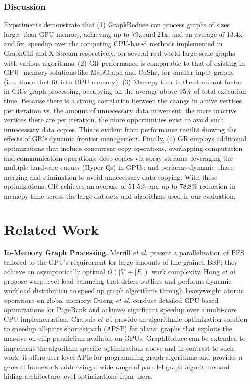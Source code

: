 \subsubsection{Discussion}
Experiments demonstrate that (1) GraphReduce can process graphs of sizes larger than GPU memory, achieving up to 79x and 21x, and an average of 13.4x and 5x, speedup over the competing CPU-based methods implemented in GraphChi and X-Stream respectively, for several real-world 
large-scale graphs with various algorithms. (2) GR performance is comparable to that of existing in-GPU- memory solutions like 
MapGraph and CuSha, for smaller input graphs (i.e., those that fit into GPU memory). (3) Memcpy time is the dominant factor in GR's
graph processing, occupying on the average above 95\% of total execution time. Because there is a strong correlation between the change 
in active vertices per iteration vs. the amount of unnecessary data movement, the more inactive vertices there are per iteration,
the more opportunities exist to avoid such unnecessary data copies. This is evident from performance results showing the effects of GR's
dynamic frontier management. Finally, (4) GR employs additional optimizations that include concurrent copy operations, overlapping 
computation and communication operations; deep copies via spray streams, leveraging the multiple hardware queues (Hyper-Qs) in GPUs; 
and performs dynamic phase merging and elimination to avoid unnecessary data copying. With these optimizations, GR achieves an average 
of 51.5\% and up to 78.8\% reduction in memcpy time across the large datasets and algorithms used in our evaluation. 

\iffalse
\section{Related Work}
{\bf In-Memory Graph Processing.} Merrill \textit{et al.}\cite{Merrill} present 
a parallelization of BFS tailored to the GPU's requirement for large amounts of fine-grained BSP; they achieve an asymptotically 
optimal $O(|V|+|E|)$ work complexity. 
Hong \textit{et al.}\cite{Hong} propose warp-level load-balancing that defers outliers 
and performs dynamic workload distribution to speed up graph algorithms through heavyweight atomic operations on global memory. 
Duong \textit{et al.} \cite{Duong} conduct detailed GPU-based optimizations for PageRank and achieves significant speedup over 
a multi-core CPU implementation. Chapuis \textit{et al.} \cite{ASSP} provide an algorithmic optimization solution to speedup 
all-pairs shortestpath (APSP) for planar graphs that exploits the massive on-chip parallelism available on GPUs. 
GraphReduce can be extended to implement the algorithm-specific optimizations above and in contrast to such work, it offers
user-level APIs for programming graph algorithms and provides a general framework addressing a wide range of parallel graph algorithms 
and hiding architecture-level optimizations from users.


